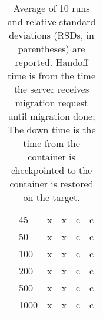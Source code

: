 \begin{table}[h]
{\begin{tabular}{|P{3.5em}|P{1.8em}|P{5em}|P{5em}|P{5em}|P{4.5em}|}
 &45    &x  &x  & c &c \\
 &50    &x  &x  & c &c \\
 &100    &x  &x  & c &c \\
 &200    &x  &x  & c &c \\
 &500    &x  &x  & c &c \\
 &1000    &x  &x  & c &c \\
\end{tabular}
}
    \caption{
        Average of 10 runs and relative standard deviations (RSDs, in parentheses) are reported. 
        Handoff time is from the time the server receives migration request until migration done; 
        The down time is the time from the container is checkpointed to the container is restored on the target.
    }
    \label{tab:perform}
\end{table}







